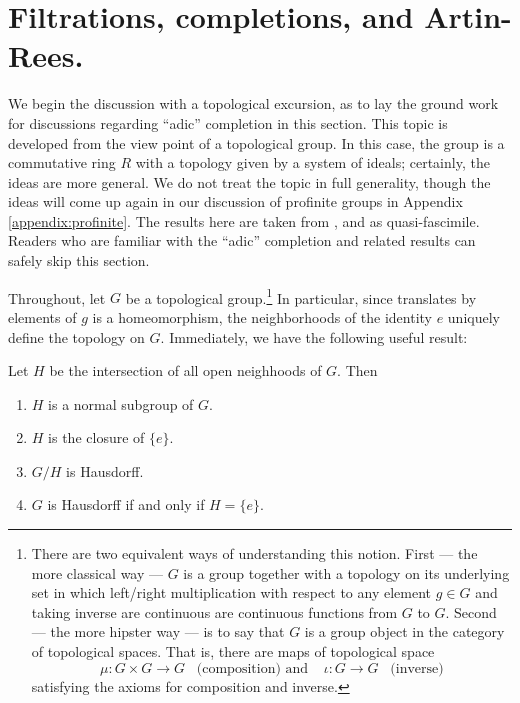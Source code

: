 \section{Filtrations, completions, and Artin-Rees.}

We begin the discussion with a topological excursion, as to lay 
the ground work for discussions regarding ``adic'' completion in 
this section. This topic is developed from the view point of a 
topological group. In this case, the group is a commutative ring 
$R$ with a topology given by a system of ideals; certainly, the 
ideas are more general. We do not treat the topic in full 
generality, though the ideas will come up again in our discussion 
of profinite groups in Appendix \ref{appendix:profinite}. The
results here are taken from \cite{AM}, \cite{MatsCA} and 
\cite{Eisenbud} as quasi-fascimile. Readers who are familiar with
the ``adic'' completion and related results can safely skip this
section.

Throughout, let $G$ be a topological group.\footnote{There are two 
equivalent ways of understanding this notion. First --- the more 
classical way --- $G$ is a group together with a topology on its 
underlying set in which left/right multiplication with respect to 
any element $g \in G$ and taking inverse are continuous are 
continuous functions from $G$ to $G$.  Second --- the more hipster 
way --- is to say that $G$ is a group object in the category of 
topological spaces. That is, there are maps of topological space
\[
\mu: G \times G \to G\;\;\;\textrm{(composition) and}\;\;\;\;
\iota: G \to G\;\;\;\textrm{(inverse)}
\]
satisfying the axioms for composition and inverse.} In particular, 
since translates by elements of $g$ is a homeomorphism, the 
neighborhoods of the identity $e$ uniquely define the topology on 
$G$. Immediately, we have the following useful result:

\begin{lem}
Let $H$ be the intersection of all open neighhoods of $G$. Then
\begin{enumerate}
\item $H$ is a normal subgroup of $G$.

\item $H$ is the closure of $\{e\}$.

\item $G/H$ is Hausdorff.

\item $G$ is Hausdorff if and only if $H = \{e\}$.
\end{enumerate}
\end{lem}

